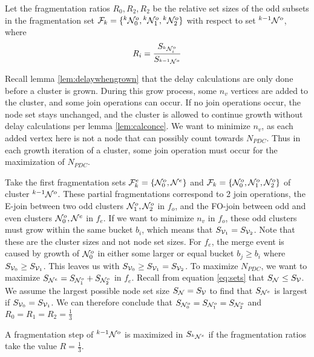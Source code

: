 \begin{lemma}\label{lem:fragratio}
  Let the fragmentation ratios $R_0, R_2, R_2$ be the relative set sizes of the odd subsets in the fragmentation set $\mathcal{F}_{k} = \{{}^{k}\mathcal{N}^o_0, {}^{k}\mathcal{N}^{o}_1, {}^{k}\mathcal{N}^{o}_2 \}$ with respect to set ${}^{k-1}\mathcal{N}^o$, where
  \begin{equation}\label{eq:fragratio}
    R_i = \frac{S_{{}^{k}\mathcal{N}^o_i}}{S_{{}^{k-1}\mathcal{N}^o}}
  \end{equation}
\end{lemma}

Recall lemma \ref{lem:delaywhengrown} that the delay calculations are only done before a cluster is grown. During this grow process, some $n_v$ vertices are added to the cluster, and some join operations can occur. If no join operations occur, the node set stays unchanged, and the cluster is allowed to continue growth without delay calculations per lemma \ref{lem:calconce}. We want to minimize $n_v$, as each added vertex here is not a node that can possibly count towards $N_{PDC}$. Thus in each growth iteration of a cluster, some join operation must occur for the maximization of $N_{PDC}$.

Take the first fragmentation sets $\mathcal{F}^e_{k} = \{\mathcal{N}^o_0, \mathcal{N}^{e} \}$ and $\mathcal{F}_{k} = \{\mathcal{N}^o_0, \mathcal{N}^{o}_1, \mathcal{N}^{o}_2 \}$ of cluster ${}^{k-1}\mathcal{N}^o$. These partial fragmentations correspond to 2 join operations, the E-join between two odd clusters $ \mathcal{N}^{o}_1, \mathcal{N}^{o}_2 $ in $f_o$, and the FO-join between odd and even clusters $\mathcal{N}^o_0, \mathcal{N}^{e} $ in $f_e$. If we want to minimize $n_v$ in $f_o$, these odd clusters must grow within the same bucket $b_i$, which means that $S_{\mathcal{V}_1} = S_{\mathcal{V}_2}$. Note that these are the cluster sizes and not node set sizes. For $f_e$, the merge event is caused by growth of $\mathcal{N}^o_0$ in either some larger or equal bucket $b_j \geq b_i$ where $ S_{\mathcal{V}_0} \geq S_{\mathcal{V}_1} $. This leaves us with $S_{\mathcal{V}_0} \geq S_{\mathcal{V}_1} = S_{\mathcal{V}_2}$. To maximize $N_{PDC}$, we want to maximize $S_{\mathcal{N}^e} = S_{\mathcal{N}^o_1} + S_{\mathcal{N}^o_2}$ in $f_e$. Recall from equation \eqref{eq:sets} that $S_{\mathcal{N}} \leq S_{\mathcal{V}}$. We assume the largest possible node set size $S_{\mathcal{N}} = S_{\mathcal{V}}$ to find that $ S_{\mathcal{N}^e} $ is largest if $S_{\mathcal{V}_0} = S_{\mathcal{V}_1}$. We can therefore conclude that $S_{\mathcal{N}^o_0} = S_{\mathcal{N}^o_1} = S_{\mathcal{N}^o_2}$ and $R_0 = R_1 = R_2 = \frac{1}{3}$

\begin{lemma}\label{lem:thirdratio}
  A fragmentation step of ${}^{k-1}\mathcal{N}^o$ is maximized in $S_{{}^{k}\mathcal{N}^e}$ if the fragmentation ratios take the value $R = \frac{1}{3}$.
\end{lemma}

